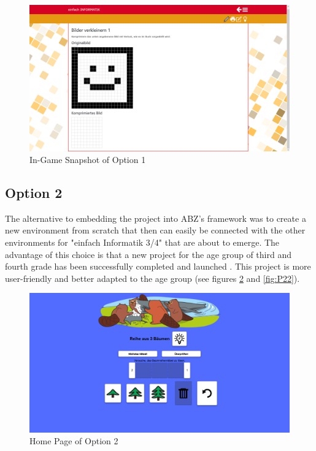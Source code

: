 \begin{figure}[H]
    \centering
    \includegraphics[width=1.0\columnwidth]{figures/P11.png}
    \caption{In-Game Snapshot of Option 1}
    \label{fig:P12} 
\end{figure}

\newpage
\subsection{Option 2}
The alternative to embedding the project into ABZ's framework was to create a new environment from scratch that then can easily be connected with the other environments for "einfach Informatik 3/4" that are about to emerge. The advantage of this choice is that a new project for the age group of third and fourth grade has been successfully completed and launched \cite{FBBT}. This project is more user-friendly and better adapted to the age group (see figures \ref{fig:P21} and  \ref{fig:P22}).

\begin{figure}[H]
    \centering
    \includegraphics[width=1.0\columnwidth]{figures/P21.png}
    \caption{Home Page of Option 2}
    \label{fig:P21} 
\end{figure}

